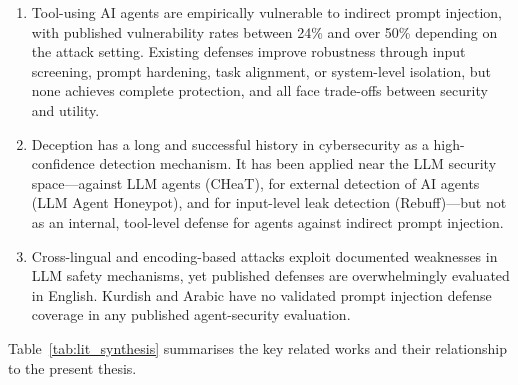 \begin{enumerate}[nosep]
  \item Tool-using AI agents are empirically vulnerable to indirect prompt injection, with published vulnerability rates between 24\% and over 50\% depending on the attack setting.  Existing defenses improve robustness through input screening, prompt hardening, task alignment, or system-level isolation, but none achieves complete protection, and all face trade-offs between security and utility.
  \item Deception has a long and successful history in cybersecurity as a high-confidence detection mechanism.  It has been applied near the LLM security space---against LLM agents (CHeaT), for external detection of AI agents (LLM Agent Honeypot), and for input-level leak detection (Rebuff)---but not as an internal, tool-level defense for agents against indirect prompt injection.
  \item Cross-lingual and encoding-based attacks exploit documented weaknesses in LLM safety mechanisms, yet published defenses are overwhelmingly evaluated in English.  Kurdish and Arabic have no validated prompt injection defense coverage in any published agent-security evaluation.
\end{enumerate}

Table~\ref{tab:lit_synthesis} summarises the key related works and their relationship to the present thesis.


